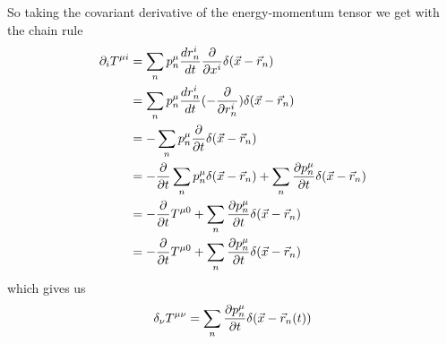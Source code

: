 So taking the covariant derivative of the energy-momentum tensor we get with the chain rule
\begin{align*}
  \partial_i T^{\mu i}
  &=
  \sum_{n} p_n^{\mu} \frac{d r_n^{i}}{d t}\frac{\partial }{\partial x^{i}} \delta(\vec{x} - \vec{r}_n)\\
  &=
  \sum_{n} p_n^{\mu} \frac{d r_n^{i}}{d t}(-\frac{\partial }{\partial r_n^{i}}) \delta(\vec{x} - \vec{r}_n)\\
  &=
  -\sum_{n} p_n^{\mu} \frac{\partial }{\partial t} \delta(\vec{x} - \vec{r}_n)\\
  &=
  -\frac{\partial }{\partial t}\sum_{n} p_n^{\mu} \delta(\vec{x} - \vec{r}_n)
  +
  \sum_{n} \frac{\partial p_n^{\mu}}{\partial t} \delta(\vec{x} - \vec{r}_n)
  \\
  &=
  - \frac{\partial }{\partial t}T^{\mu 0} + \sum_{n} \frac{\partial p_n^{\mu}}{\partial t} \delta(\vec{x} - \vec{r}_n)\\
  &= - \frac{\partial }{\partial t}T^{\mu 0} + \sum_{n} \frac{\partial p_n^{\mu}}{\partial t} \delta(\vec{x} - \vec{r}_n)
\end{align*}
which gives us
\begin{align*}
  \delta_{\nu} T^{\mu \nu} = \sum_{n} \frac{\partial p_n^{\mu}}{\partial t} \delta(\vec{x} - \vec{r}_n(t))
\end{align*}

